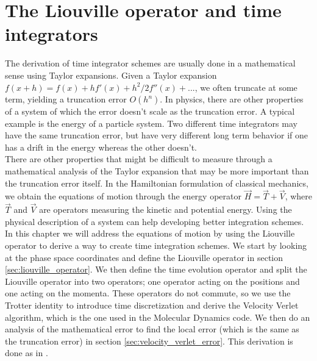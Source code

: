 \chapter{The Liouville operator and time integrators}
\label{app:liouville}
The derivation of time integrator schemes are usually done in a mathematical sense using Taylor expansions. Given a Taylor expansion $f(x+h) = f(x) + hf'(x) + h^2/2f''(x) + ...$, we often truncate at some term, yielding a truncation error $O(h^n)$. In physics, there are other properties of a system of which the error doesn't scale as the truncation error. A typical example is the energy of a particle system. Two different time integrators may have the same truncation error, but have very different long term behavior if one has a drift in the energy whereas the other doesn't.\\
There are other properties that might be difficult to measure through a mathematical analysis of the Taylor expansion that may be more important than the truncation error itself. In the Hamiltonian formulation of classical mechanics, we obtain the equations of motion through the energy operator $\vec H = \vec T + \vec V$, where $\vec T$ and $\vec V$ are operators measuring the kinetic and potential energy. Using the physical description of a system can help developing better integration schemes. \\
In this chapter we will address the equations of motion by using the Liouville operator to derive a way to create time integration schemes. We start by looking at the phase space coordinates and define the Liouville operator in section \ref{sec:liouville_operator}. We then define the time evolution operator and split the Liouville operator into two operators; one operator acting on the positions and one acting on the momenta.  These operators do not commute, so we use the Trotter identity to introduce time discretization and derive the Velocity Verlet algorithm, which is the one used in the Molecular Dynamics code. We then do an analysis of the mathematical error to find the local error (which is the same as the truncation error) in section \ref{sec:velocity_verlet_error}. This derivation is done as in \cite{frenkel2001understanding}. 

